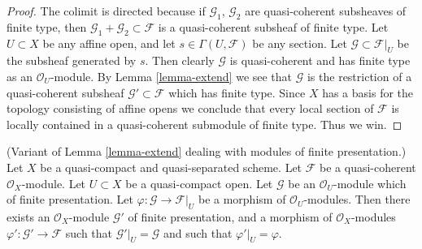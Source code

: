 \begin{proof}
The colimit is directed because if $\mathcal{G}_1$, $\mathcal{G}_2$
are quasi-coherent subsheaves of finite type, then
$\mathcal{G}_1 + \mathcal{G}_2 \subset \mathcal{F}$ is
a quasi-coherent subsheaf of finite type.
Let $U \subset X$ be any affine open, and let
$s \in \Gamma(U, \mathcal{F})$ be any section.
Let $\mathcal{G} \subset \mathcal{F}|_U$ be the
subsheaf generated by $s$. Then clearly $\mathcal{G}$
is quasi-coherent and has finite type as an $\mathcal{O}_U$-module.
By Lemma \ref{lemma-extend} we see that $\mathcal{G}$ is the restriction
of a quasi-coherent subsheaf $\mathcal{G}' \subset \mathcal{F}$
which has finite type. Since $X$ has a basis for the topology consisting
of affine opens we conclude that every local section of
$\mathcal{F}$ is locally contained in a quasi-coherent submodule
of finite type. Thus we win.
\end{proof}

\begin{lemma}
\label{lemma-extend-finite-presentation}
(Variant of Lemma \ref{lemma-extend} dealing with modules of
finite presentation.)
Let $X$ be a quasi-compact and quasi-separated scheme.
Let $\mathcal{F}$ be a quasi-coherent $\mathcal{O}_X$-module.
Let $U \subset X$ be a quasi-compact open.
Let $\mathcal{G}$ be an $\mathcal{O}_U$-module which of finite presentation.
Let $\varphi : \mathcal{G} \to \mathcal{F}|_U$ be a morphism of
$\mathcal{O}_U$-modules.
Then there exists an $\mathcal{O}_X$-module
$\mathcal{G}'$ of finite presentation, and a morphism
of $\mathcal{O}_X$-modules $\varphi' : \mathcal{G}' \to \mathcal{F}$
such that $\mathcal{G}'|_U = \mathcal{G}$ and such that
$\varphi'|_U = \varphi$.
\end{lemma}

